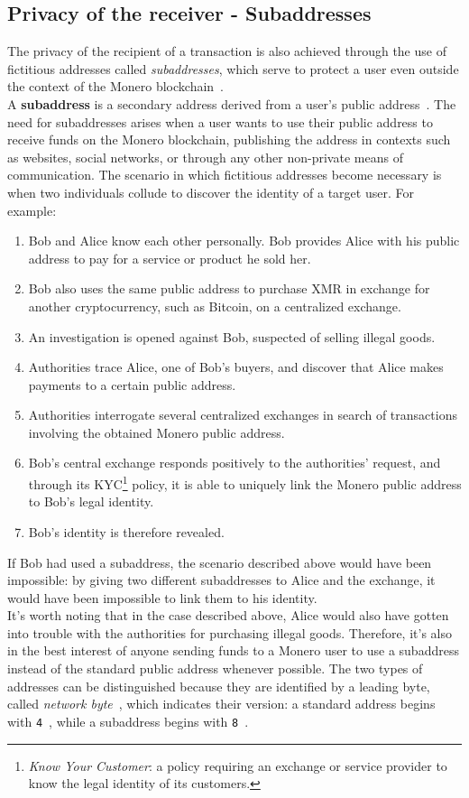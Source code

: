 \documentclass[conference]{IEEEtran}
\begin{document}
\subsection{Privacy of the receiver - Subaddresses}
The privacy of the recipient of a transaction is also achieved through the use of fictitious addresses called \textit{subaddresses}, which serve to protect a user even outside the context of the Monero blockchain~\cite{mastering_monero}.\\
A \textbf{subaddress} is a secondary address derived from a user's public address~\cite{zero_to_monero_2, mastering_monero}. The need for subaddresses arises when a user wants to use their public address to receive funds on the Monero blockchain, publishing the address in contexts such as websites, social networks, or through any other non-private means of communication. The scenario in which fictitious addresses become necessary is when two individuals collude to discover the identity of a target user. For example:
\begin{enumerate}
\item Bob and Alice know each other personally. Bob provides Alice with his public address to pay for a service or product he sold her.
\item Bob also uses the same public address to purchase XMR in exchange for another cryptocurrency, such as Bitcoin, on a centralized exchange.
\item An investigation is opened against Bob, suspected of selling illegal goods.
\item Authorities trace Alice, one of Bob's buyers, and discover that Alice makes payments to a certain public address.
\item Authorities interrogate several centralized exchanges in search of transactions involving the obtained Monero public address.
\item Bob's central exchange responds positively to the authorities' request, and through its KYC\footnote{\textit{Know Your Customer}: a policy requiring an exchange or service provider to know the legal identity of its customers.} policy, it is able to uniquely link the Monero public address to Bob's legal identity.
\item Bob's identity is therefore revealed.
\end{enumerate}
If Bob had used a subaddress, the scenario described above would have been impossible: by giving two different subaddresses to Alice and the exchange, it would have been impossible to link them to his identity.\\
It's worth noting that in the case described above, Alice would also have gotten into trouble with the authorities for purchasing illegal goods. Therefore, it's also in the best interest of anyone sending funds to a Monero user to use a subaddress instead of the standard public address whenever possible. The two types of addresses can be distinguished because they are identified by a leading byte, called \textit{network byte}~\cite{mastering_monero}, which indicates their version: a standard address begins with \texttt{4}~\cite{mastering_monero}, while a subaddress begins with \texttt{8}~\cite{mastering_monero}.\\
\end{document}
